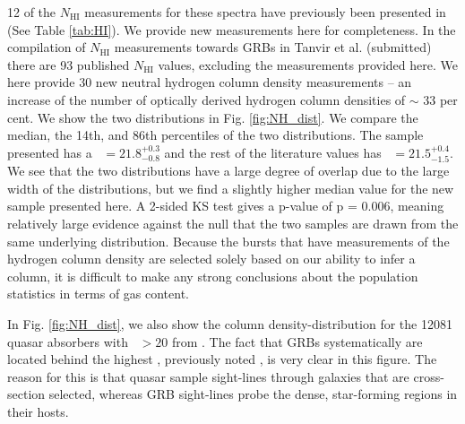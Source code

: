 \documentclass{aa}    %
\begin{document}
12 of the $N_{\mathrm{HI}}$ measurements for these spectra have previously been
presented in \citet{Cucchiara2015} (See Table \ref{tab:HI}). We provide new
measurements here for completeness. In the compilation of $N_{\mathrm{HI}}$
measurements towards GRBs in Tanvir et al. (submitted) there are 93 published
$N_{\mathrm{HI}}$ values, excluding the measurements provided here. We here
provide 30 new neutral hydrogen column density measurements -- an increase of
the number of optically derived hydrogen column densities of $\sim$ 33 per cent.
We show the two distributions in  Fig. \ref{fig:NH_dist}. We compare the median,
the 14th, and 86th percentiles of the two distributions. The sample presented
has a \nh~$= 21.8_{-0.8}^{+0.3}$ and the rest of the literature values has
\nh~$= 21.5_{-1.5}^{+0.4}$. We see that the two distributions have a large
degree of overlap due to the large width of the distributions, but we find a
slightly higher median value for the new sample presented here. A 2-sided KS
test gives a p-value of p = 0.006, meaning relatively large evidence against the
null that the two samples are drawn from the same underlying distribution.
Because the bursts that have measurements of the hydrogen column density are
selected solely based on our ability to infer a column, it is difficult to make
any strong conclusions about the population statistics in terms of gas content.

In Fig. \ref{fig:NH_dist}, we also show the column density-distribution
for the 12081 quasar absorbers with \nh~$> 20$ from \citet{Noterdaeme2012b}. The
fact that GRBs systematically are located behind the highest \nh, previously
noted \citep[e.g.,][]{Prochaska2007, Fynbo2009}, is very clear in this
figure. The reason for this is that quasar sample sight-lines through galaxies
that are cross-section selected, whereas GRB sight-lines probe the dense,
star-forming regions in their hosts.
\end{document}

